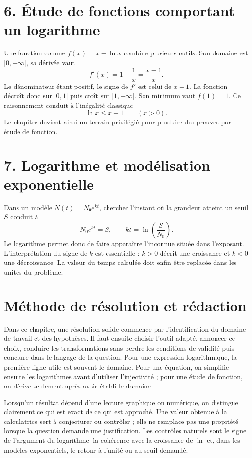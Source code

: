 \section{6. Étude de fonctions comportant un logarithme}
Une fonction comme $f(x)=x-\ln x$ combine plusieurs outils. Son domaine est $]0,+\infty[$, sa dérivée vaut
\[
f'(x)=1-\frac1x=\frac{x-1}{x}.
\]
Le dénominateur étant positif, le signe de $f'$ est celui de $x-1$. La fonction décroît donc sur $]0,1]$ puis croît sur $[1,+\infty[$. Son minimum vaut $f(1)=1$. Ce raisonnement conduit à l’inégalité classique
\[
\ln x\leq x-1\qquad (x>0).
\]
Le chapitre devient ainsi un terrain privilégié pour produire des preuves par étude de fonction.

\section{7. Logarithme et modélisation exponentielle}
Dans un modèle $N(t)=N_0e^{kt}$, chercher l’instant où la grandeur atteint un seuil $S$ conduit à
\[
N_0e^{kt}=S,\qquad kt=\ln\!\left(\frac{S}{N_0}\right).
\]
Le logarithme permet donc de faire apparaître l’inconnue située dans l’exposant. L’interprétation du signe de $k$ est essentielle : $k>0$ décrit une croissance et $k<0$ une décroissance. La valeur du temps calculée doit enfin être replacée dans les unités du problème.

\section{Méthode de résolution et rédaction}
Dans ce chapitre, une résolution solide commence par l’identification du domaine de travail et des hypothèses. Il faut ensuite choisir l’outil adapté, annoncer ce choix, conduire les transformations sans perdre les conditions de validité puis conclure dans le langage de la question. Pour une expression logarithmique, la première ligne utile est souvent le domaine. Pour une équation, on simplifie ensuite les logarithmes avant d’utiliser l’injectivité ; pour une étude de fonction, on dérive seulement après avoir établi le domaine.

Lorsqu’un résultat dépend d’une lecture graphique ou numérique, on distingue clairement ce qui est exact de ce qui est approché. Une valeur obtenue à la calculatrice sert à conjecturer ou contrôler ; elle ne remplace pas une propriété lorsque la question demande une justification. Les contrôles naturels sont le signe de l’argument du logarithme, la cohérence avec la croissance de $\ln$ et, dans les modèles exponentiels, le retour à l’unité ou au seuil demandé.

